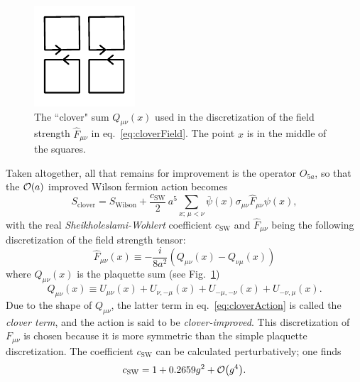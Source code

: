 \begin{figure}
  \centering
  \includegraphics[width=0.5\linewidth]{figs/clover.pdf}
  \caption{The ``clover" sum $Q_{\mu\nu}(x)$ used in the discretization of the
           field strength $\hat{F}_{\mu\nu}$ in eq.~\eqref{eq:cloverField}.
           The point $x$ is in the middle of the squares.}
           
  \label{fig:clover}
\end{figure}

Taken altogether, all that remains for improvement is the operator $O_{5a}$,
so that the $\order{a}$ improved Wilson fermion action becomes
\begin{equation}\label{eq:cloverAction}
  S_\text{clover}=S_\text{Wilson}+\frac{c_\text{SW}}{2}
               \,a^5\sum_{x;\,\mu<\nu}\bar{\psi}(x)
                  \sigma_{\mu\nu}\hat{F}_{\mu\nu}\psi(x),
\end{equation}
with the real {\it Sheikholeslami-Wohlert} coefficient $c_\text{SW}$
\cite{sheikholeslami_improved_1985} and $\hat{F}_{\mu\nu}$ being the
following discretization of the field strength tensor:
\begin{equation}\label{eq:cloverField}
  \hat{F}_{\mu\nu}(x)\equiv
    -\frac{i}{8a^2}\left(Q_{\mu\nu}(x)-Q_{\nu\mu}(x)\right)
\end{equation}
where $Q_{\mu\nu}(x)$ is the plaquette sum (see Fig.~\ref{fig:clover})
\begin{equation}
  Q_{\mu\nu}(x)\equiv U_{\mu\nu}(x)+U_{\nu,-\mu}(x)
                 +U_{-\mu,-\nu}(x)+U_{-\nu,\mu}(x).
\end{equation}
Due to the shape of $Q_{\mu\nu}$, the latter term in 
eq.~\eqref{eq:cloverAction} is called the {\it clover term}, and the
action is said to be {\it clover-improved}.
This discretization of $F_{\mu\nu}$ is chosen because it is more
symmetric than the simple plaquette discretization.
The coefficient $c_\text{SW}$ can be calculated perturbatively; one finds
\cite{sheikholeslami_improved_1985}
\begin{equation}\label{eq:SWcoeff}
  c_\text{SW}=1+0.2659 g^2+\order{g^4}.
\end{equation} 


